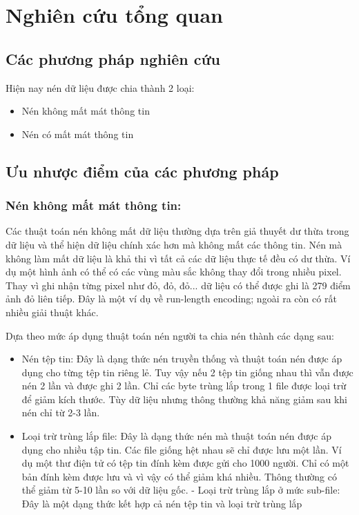 \chapter{Nghiên cứu tổng quan}
\label{cha: chap1}

\section{Các phương pháp nghiên cứu}

Hiện nay nén dữ liệu được chia thành 2 loại:
\begin{itemize}
      \item Nén không mất mát thông tin
      \item Nén có mất mát thông tin
\end{itemize}

\section{Ưu nhược điểm của các phương pháp}
\subsection{Nén không mất mát thông tin: }

Các thuật toán nén không mất dữ liệu thường dựa trên giả thuyết dư thừa trong dữ liệu
và thể hiện dữ liệu chính xác hơn mà không mất các thông tin. Nén mà không làm mất dữ
liệu là khả thi vì tất cả các dữ liệu thực tế đều có dư thừa. Ví dụ một hình ảnh có thể
có các vùng màu sắc không thay đổi trong nhiều pixel. Thay vì ghi nhận từng pixel
như đỏ, đỏ, đỏ... dữ liệu có thể được ghi là 279 điểm ảnh đỏ liên tiếp. Đây là một
ví dụ về run-length encoding; ngoài ra còn có rất nhiều giải thuật khác.

Dựa theo mức áp dụng thuật toán nén người ta chia nén thành các dạng sau:
\begin{itemize}
      \item Nén tệp tin: Đây là dạng thức nén truyền thống và thuật toán nén được
            áp dụng cho từng tệp tin riêng lẻ. Tuy vậy nếu 2 tệp tin giống nhau thì vẫn
            được nén 2 lần và được ghi 2 lần. Chỉ các byte trùng lắp trong 1 file được loại
            trừ để giảm kích thước. Tùy dữ liệu nhưng thông thường khả năng giảm sau khi
            nén chỉ từ 2-3 lần.
      \item Loại trừ trùng lắp file: Đây là dạng thức nén mà thuật toán nén được
            áp dụng cho nhiều tập tin. Các file giống hệt nhau sẽ chỉ được lưu một lần.
            Ví dụ một thư điện tử có tệp tin đính kèm được gửi cho 1000 người. Chỉ có một
            bản đính kèm được lưu và vì vậy có thể giảm khá nhiều. Thông thường có thể giảm
            từ 5-10 lần so với dữ liệu gốc. - Loại trừ trùng lắp ở mức sub-file: Đây là một
            dạng thức kết hợp cả nén tệp tin và loại trừ trùng lắp
\end{itemize}


